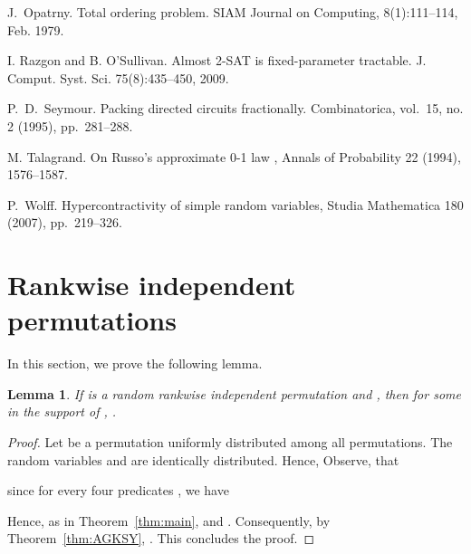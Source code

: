 \documentclass[11pt]{article}
\newtheorem{lemma}[theorem]{Lemma}
\begin{document}
\begin{thebibliography}{WW}
J.~Opatrny. Total ordering problem. SIAM Journal on Computing, 8(1):111--114, Feb. 1979.

 I. Razgon and B. O'Sullivan. Almost 2-SAT is fixed-parameter tractable. J. Comput. Syst.
Sci. 75(8):435--450, 2009.

 P.~D.~Seymour. Packing directed circuits fractionally. Combinatorica, vol.~15, no. 2 (1995), pp.~281--288.

M. Talagrand. On Russo’s approximate 0-1 law , Annals of Probability 22 (1994), 1576--1587.

P.~Wolff. Hypercontractivity of simple random variables, Studia Mathematica
180 (2007), pp.~219--326.
\end{thebibliography}
\appendix




\section{Rankwise independent permutations}\label{sec:rankwise}
In this section, we prove the following lemma.

\begin{lemma}\label{lem:rankwise}
If  is a random  rankwise independent permutation and , then for some  in the
support of , .
\end{lemma}
\begin{proof}
Let  be a permutation uniformly distributed among all  permutations. The random variables  and 
are identically distributed. Hence,
 Observe, that

since for every four predicates , we have

Hence, as in Theorem~\ref{thm:main},  and
.
Consequently, by Theorem~\ref{thm:AGKSY}, .
This concludes the proof.
\end{proof}
\end{document}
